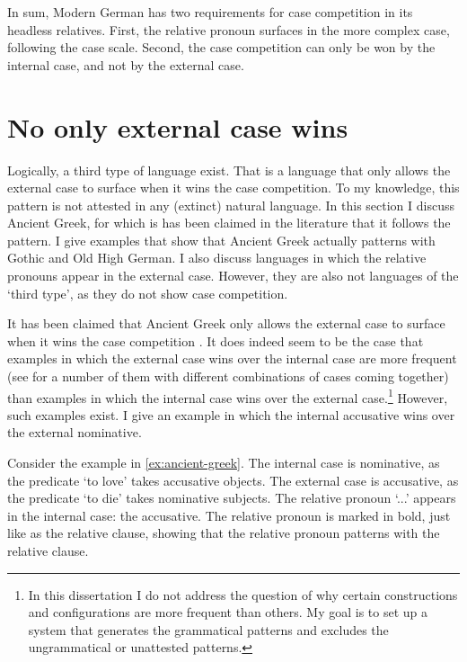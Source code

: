 In sum, Modern German has two requirements for case competition in its headless relatives. First, the relative pronoun surfaces in the more complex case, following the case scale. Second, the case competition can only be won by the internal case, and not by the external case.

\section{No only external case wins}

Logically, a third type of language exist. That is a language that only allows the external case to surface when it wins the case competition. To my knowledge, this pattern is not attested in any (extinct) natural language. In this section I discuss Ancient Greek, for which is has been claimed in the literature that it follows the pattern. I give examples that show that Ancient Greek actually patterns with Gothic and Old High German. I also discuss languages in which the relative pronouns appear in the external case. However, they are also not languages of the `third type', as they do not show case competition.

It has been claimed that Ancient Greek only allows the external case to surface when it wins the case competition  \citep[cf.][]{cinqueforthcoming}. It does indeed seem to be the case that examples in which the external case wins over the internal case are more frequent (see \citealt{kakarikos2014} for a number of them with different combinations of cases coming together) than examples in which the internal case wins over the external case.\footnote{
In this dissertation I do not address the question of why certain constructions and configurations are more frequent than others. My goal is to set up a system that generates the grammatical patterns and excludes the ungrammatical or unattested patterns.
}
However, such examples exist. I give an example in which the internal accusative wins over the external nominative.

Consider the example in \ref{ex:ancient-greek}.
The internal case is nominative, as the predicate  `to love' takes accusative objects.
The external case is accusative, as the predicate  `to die' takes nominative subjects.
The relative pronoun  `...' appears in the internal case: the accusative. The relative pronoun is marked in bold, just like as the relative clause, showing that the relative pronoun patterns with the relative clause.

